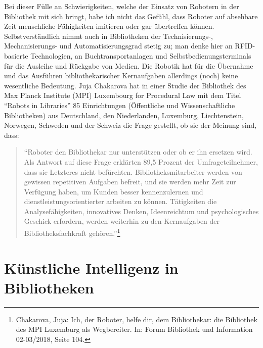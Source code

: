 \documentclass[a4paper,
fontsize=11pt,
oneside,
numbers=noperiodatend,
parskip=half-,
bibliography=totoc,
final
]{scrartcl}
\begin{document}
Bei dieser Fülle an Schwierigkeiten, welche der Einsatz von Robotern in
der Bibliothek mit sich bringt, habe ich nicht das Gefühl, dass Roboter
auf absehbare Zeit menschliche Fähigkeiten imitieren oder gar
übertreffen können. Selbstverständlich nimmt auch in Bibliotheken der
Technisierungs-, Mechanisierungs- und Automatisierungsgrad stetig zu;
man denke hier an RFID-basierte Technologien, an Buchtransportanlagen
und Selbstbedienungsterminals für die Ausleihe und Rückgabe von Medien.
Die Robotik hat für die Übernahme und das Ausführen bibliothekarischer
Kernaufgaben allerdings (noch) keine wesentliche Bedeutung. Juja
Chakarova hat in einer Studie der Bibliothek des Max Planck Institute
(MPI) Luxembourg for Procedural Law mit dem Titel \enquote{Robots in
Libraries} 85 Einrichtungen (Öffentliche und Wissenschaftliche
Bibliotheken) aus Deutschland, den Niederlanden, Luxemburg,
Liechtenstein, Norwegen, Schweden und der Schweiz die Frage gestellt, ob
sie der Meinung sind, dass:

\begin{quote}
\enquote{Roboter den Bibliothekar nur unterstützen oder ob er ihn
ersetzen wird. Als Antwort auf diese Frage erklärten 89,5 Prozent der
Umfrageteilnehmer, dass sie Letzteres nicht befürchten.
Bibliotheksmitarbeiter werden von gewissen repetitiven Aufgaben befreit,
und sie werden mehr Zeit zur Verfügung haben, um Kunden besser
kennenzulernen und dienstleistungsorientierter arbeiten zu können.
Tätigkeiten die Analysefähigkeiten, innovatives Denken, Ideenreichtum
und psychologisches Geschick erfordern, werden weiterhin zu den
Kernaufgaben der Bibliotheksfachkraft gehören.}\footnote{Chakarova,
  Juja: Ich, der Roboter, helfe dir, dem Bibliothekar: die Bibliothek
  des MPI Luxemburg als Wegbereiter. In: Forum Bibliothek und Information
  02-03/2018, Seite 104.}
\end{quote}

\hypertarget{kuxfcnstliche-intelligenz-in-bibliotheken}{%
\section{Künstliche Intelligenz in
Bibliotheken}\label{kuxfcnstliche-intelligenz-in-bibliotheken}}
\end{document}
